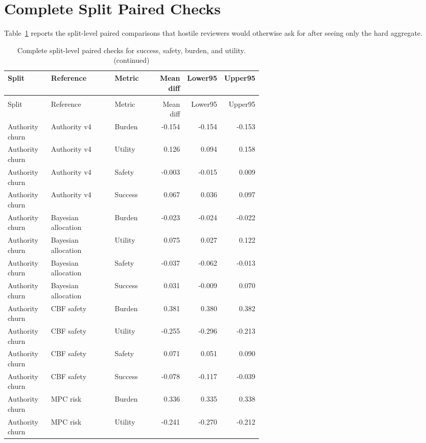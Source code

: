 \documentclass{article}
\begin{document}
\section{Complete Split Paired Checks}

Table~\ref{tab:splitpaired} reports the split-level paired comparisons that hostile reviewers would otherwise ask for after seeing only the hard aggregate.

\begin{center}
\tiny
\begin{longtable}{p{0.17\linewidth}p{0.25\linewidth}p{0.16\linewidth}rrr}
\caption{Complete split-level paired checks for success, safety, burden, and utility.}\label{tab:splitpaired}\\
\toprule
Split & Reference & Metric & Mean diff & Lower95 & Upper95\\
\midrule
\endfirsthead
\caption[]{Complete split-level paired checks for success, safety, burden, and utility. (continued)}\\
\toprule
Split & Reference & Metric & Mean diff & Lower95 & Upper95\\
\midrule
\endhead
Authority churn & Authority v4 & Burden & -0.154 & -0.154 & -0.153\\
Authority churn & Authority v4 & Utility & 0.126 & 0.094 & 0.158\\
Authority churn & Authority v4 & Safety & -0.003 & -0.015 & 0.009\\
Authority churn & Authority v4 & Success & 0.067 & 0.036 & 0.097\\
Authority churn & Bayesian allocation & Burden & -0.023 & -0.024 & -0.022\\
Authority churn & Bayesian allocation & Utility & 0.075 & 0.027 & 0.122\\
Authority churn & Bayesian allocation & Safety & -0.037 & -0.062 & -0.013\\
Authority churn & Bayesian allocation & Success & 0.031 & -0.009 & 0.070\\
Authority churn & CBF safety & Burden & 0.381 & 0.380 & 0.382\\
Authority churn & CBF safety & Utility & -0.255 & -0.296 & -0.213\\
Authority churn & CBF safety & Safety & 0.071 & 0.051 & 0.090\\
Authority churn & CBF safety & Success & -0.078 & -0.117 & -0.039\\
Authority churn & MPC risk & Burden & 0.336 & 0.335 & 0.338\\
Authority churn & MPC risk & Utility & -0.241 & -0.270 & -0.212\\

\end{longtable}
\end{center}
\end{document}
